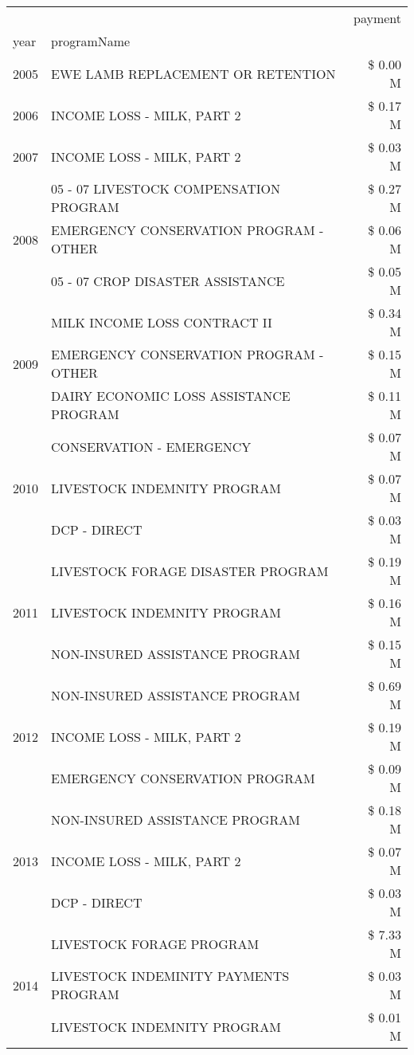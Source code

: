 \begin{tabular}{llr}
\toprule
 &  & payment \\
year & programName &  \\
\midrule
2005 & EWE LAMB REPLACEMENT OR RETENTION & \$ 0.00 M \\
\cline{1-3}
2006 & INCOME LOSS - MILK, PART 2 & \$ 0.17 M \\
\cline{1-3}
2007 & INCOME LOSS - MILK, PART 2 & \$ 0.03 M \\
\cline{1-3}
\multirow[t]{3}{*}{2008} & 05 - 07 LIVESTOCK COMPENSATION PROGRAM & \$ 0.27 M \\
 & EMERGENCY CONSERVATION PROGRAM - OTHER & \$ 0.06 M \\
 & 05 - 07 CROP DISASTER ASSISTANCE & \$ 0.05 M \\
\cline{1-3}
\multirow[t]{3}{*}{2009} & MILK INCOME LOSS CONTRACT II & \$ 0.34 M \\
 & EMERGENCY CONSERVATION PROGRAM - OTHER & \$ 0.15 M \\
 & DAIRY ECONOMIC LOSS ASSISTANCE PROGRAM & \$ 0.11 M \\
\cline{1-3}
\multirow[t]{3}{*}{2010} & CONSERVATION - EMERGENCY & \$ 0.07 M \\
 & LIVESTOCK INDEMNITY PROGRAM & \$ 0.07 M \\
 & DCP - DIRECT & \$ 0.03 M \\
\cline{1-3}
\multirow[t]{3}{*}{2011} & LIVESTOCK FORAGE DISASTER PROGRAM & \$ 0.19 M \\
 & LIVESTOCK INDEMNITY PROGRAM & \$ 0.16 M \\
 & NON-INSURED ASSISTANCE PROGRAM & \$ 0.15 M \\
\cline{1-3}
\multirow[t]{3}{*}{2012} & NON-INSURED ASSISTANCE PROGRAM & \$ 0.69 M \\
 & INCOME LOSS - MILK, PART 2 & \$ 0.19 M \\
 & EMERGENCY CONSERVATION PROGRAM & \$ 0.09 M \\
\cline{1-3}
\multirow[t]{3}{*}{2013} & NON-INSURED ASSISTANCE PROGRAM & \$ 0.18 M \\
 & INCOME LOSS - MILK, PART 2 & \$ 0.07 M \\
 & DCP - DIRECT & \$ 0.03 M \\
\cline{1-3}
\multirow[t]{3}{*}{2014} & LIVESTOCK FORAGE PROGRAM & \$ 7.33 M \\
 & LIVESTOCK INDEMINITY PAYMENTS PROGRAM & \$ 0.03 M \\
 & LIVESTOCK INDEMNITY PROGRAM & \$ 0.01 M \\
\cline{1-3}

\end{tabular}
